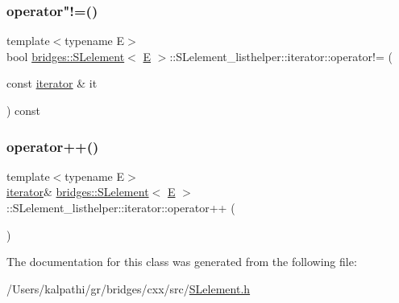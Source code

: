 \subsubsection{\texorpdfstring{operator"!=()}{operator!=()}}
{\footnotesize\ttfamily template$<$typename E$>$ \\
bool \mbox{\hyperlink{classbridges_1_1_s_lelement}{bridges\+::\+S\+Lelement}}$<$ \mbox{\hyperlink{namespacebridges_acfb0a4f7877d8f63de3e6862004c50eda3a3ea00cfc35332cedf6e5e9a32e94da}{E}} $>$\+::S\+Lelement\+\_\+listhelper\+::iterator\+::operator!= (\begin{DoxyParamCaption}\item[{const \mbox{\hyperlink{classbridges_1_1_s_lelement_1_1_s_lelement__listhelper_1_1iterator}{iterator}} \&}]{it }\end{DoxyParamCaption}) const\hspace{0.3cm}{\ttfamily [inline]}}

\mbox{\label{classbridges_1_1_s_lelement_1_1_s_lelement__listhelper_1_1iterator_acc2e5d9cba1b837897c0ff8d42618d3a}} 
\subsubsection{\texorpdfstring{operator++()}{operator++()}}
{\footnotesize\ttfamily template$<$typename E$>$ \\
\mbox{\hyperlink{classbridges_1_1_s_lelement_1_1_s_lelement__listhelper_1_1iterator}{iterator}}\& \mbox{\hyperlink{classbridges_1_1_s_lelement}{bridges\+::\+S\+Lelement}}$<$ \mbox{\hyperlink{namespacebridges_acfb0a4f7877d8f63de3e6862004c50eda3a3ea00cfc35332cedf6e5e9a32e94da}{E}} $>$\+::S\+Lelement\+\_\+listhelper\+::iterator\+::operator++ (\begin{DoxyParamCaption}{ }\end{DoxyParamCaption})\hspace{0.3cm}{\ttfamily [inline]}}



The documentation for this class was generated from the following file\+:\begin{DoxyCompactItemize}
\item 
/\+Users/kalpathi/gr/bridges/cxx/src/\mbox{\hyperlink{_s_lelement_8h}{S\+Lelement.\+h}}\end{DoxyCompactItemize}
